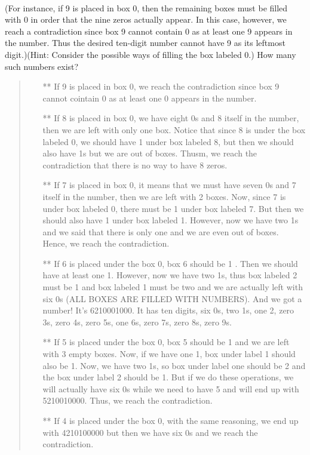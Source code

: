 \documentclass[12pt, a4paper]{article}                      %
\begin{document}
\begin{itemize}
\begin{table}[h!]
\begin{adjustbox}{max width=\textwidth}
{    }
	\end{adjustbox}
\end{table}
\\
(For instance, if 9 is placed in box 0, then the remaining boxes must be filled with
0 in order that the nine zeros actually appear. In this case, however, we reach a contradiction
since box 9 cannot contain 0 as at least one 9 appears in the number. Thus the desired ten-digit
number cannot have 9 as its leftmost digit.)(Hint: Consider the possible ways of filling the box
labeled 0.) How many such numbers exist?
\begin{quote}
\begin{itemize}
\item[**]
If 9 is placed in box 0, we reach the contradiction since box 9 cannot cointain 0 as at least one 0 appears in the number.
\item[**]
If 8 is placed in box 0, we have eight 0s and 8 itself in the number, then we are left with only one box. Notice that since 8 is under
the box labeled 0, we should have 1 under box labeled 8, but then we should also have 1s but we are out of boxes. Thusm, we
reach the contradiction that there is no way to have 8 zeros. 
\item[**]
If 7 is placed in box 0, it means that we must have seven 0s and 7 itself in the number, then we are left with 2 boxes. Now, since 7 is
under box labeled 0, there must be 1 under box labeled 7. But then we should also have 1 under box labeled 1. However, now we have two 1s
and we said that there is only one and we are even out of boxes. Hence, we reach the contradiction.
\item[**]
If 6 is placed under the box 0, box 6 should be 1 . Then we should have at least one 1.
However, now we have two 1s, thus box labeled 2 must be 1 and box labeled 1 must be two and we are actually left with six 0s (ALL BOXES ARE FILLED WITH NUMBERS).
And we got a number! It's 6210001000. It has ten digits, six 0s, two 1s, one 2, zero 3s, zero 4s, zero 5s, one 6s, zero 7s, zero 8s, zero 9s.
\item[**]
If 5 is placed under the box 0, box 5 should be 1 and we are left with 3 empty boxes. Now, if we have one 1, box under label 1 should also be 1.
Now, we have two 1s, so box under label one should be 2 and the box under label 2 should be 1. But if we do these operations, we will actually have
six 0s while we need to have 5 and will end up with 5210010000. Thus, we reach the contradiction.
\item[**]
If 4 is placed under the box 0, with the same reasoning, we end up with 4210100000 but then we have six 0s and we reach the contradiction.

\end{itemize}
\end{quote}
\end{itemize}
\end{document}
